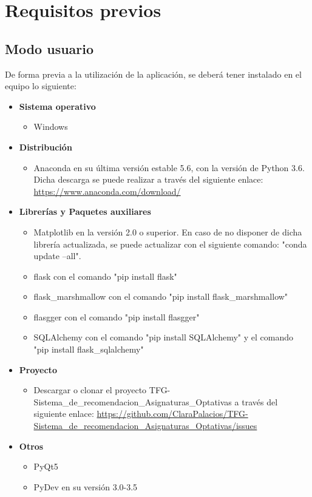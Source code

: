 
\section{Requisitos previos}
\subsection{Modo usuario}
De forma previa a la utilización de la aplicación, se deberá tener instalado en el equipo lo siguiente: 
\begin{itemize}
\item \textbf{Sistema operativo}
\begin{itemize}
\item Windows
\end{itemize} 
\item \textbf{Distribución}
\begin{itemize}
\item Anaconda en su última versión estable 5.6, con la versión de Python 3.6. Dicha descarga se puede realizar a través del siguiente enlace: \url{https://www.anaconda.com/download/}
\end{itemize}
\item \textbf{Librerías  y Paquetes auxiliares}
\begin{itemize}
\item Matplotlib en la versión 2.0 o superior. En caso de no disponer de dicha librería actualizada, se puede actualizar con el siguiente comando: "conda update --all".
\item flask con el comando "pip install flask"
\item flask\_marshmallow con el comando "pip install flask\_marshmallow"
\item flasgger con el comando "pip install flasgger"
\item SQLAlchemy con el comando "pip install SQLAlchemy" y el comando "pip install flask\_sqlalchemy"
\end{itemize}
\item \textbf{Proyecto}
\begin{itemize}
\item Descargar o clonar el proyecto TFG-Sistema\_de\_recomendacion\_Asignaturas\_Optativas a través del siguiente enlace: \url{https://github.com/ClaraPalacios/TFG-Sistema_de_recomendacion_Asignaturas_Optativas/issues}
\end{itemize}
\item \textbf{Otros}
\begin{itemize}
\item PyQt5
\item PyDev en su versión 3.0-3.5
\end{itemize}
\end{itemize}

